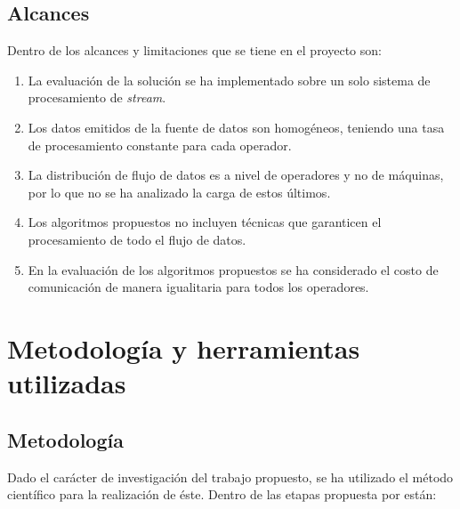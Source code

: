 \subsection{Alcances}
Dentro de los alcances y limitaciones que se tiene en el proyecto son:
\begin{enumerate}
	\item La evaluación de la solución se ha implementado sobre un solo sistema de procesamiento de \textit{stream}.
	\item Los datos emitidos de la fuente de datos son homogéneos, teniendo una tasa de procesamiento \normalsize{constante para cada operador.}
	\item La distribución de flujo de datos es a nivel de operadores y no de máquinas, por lo que no se ha analizado la carga de estos \'ultimos.
	\item Los algoritmos propuestos no incluyen t\'ecnicas que garanticen el procesamiento de todo el flujo de datos.
	\item En la evaluación de los algoritmos propuestos se ha considerado el costo de comunicación de manera igualitaria para todos los operadores.
\end{enumerate}


\section{Metodología y herramientas utilizadas}
\label{intro:metodologia}

\subsection{Metodología}
Dado el carácter de investigación del trabajo propuesto, se ha utilizado el método científico para la realización de éste. Dentro de las etapas propuesta por \citep{hernandez2010metodologia} están:

